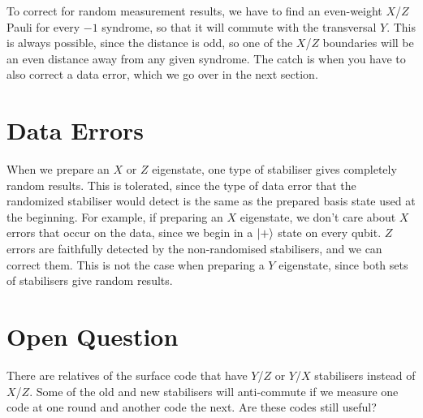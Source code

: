 \documentclass[a4paper, english]{scrartcl}
\begin{document}
To correct for random measurement results, we have to find an even-weight $X$/$Z$ Pauli for every $-1$ syndrome, so that it will commute with the transversal $Y$.
This is always possible, since the distance is odd, so one of the $X$/$Z$ boundaries will be an even distance away from any given syndrome.
The catch is when you have to also correct a data error, which we go over in the next  section.

\section{Data Errors}
When we prepare an $X$ or $Z$ eigenstate, one type of stabiliser gives completely random results. 
This is tolerated, since the type of data error that the randomized stabiliser would detect is the same as the prepared basis state used at the beginning. 
For example, if preparing an $X$ eigenstate, we don't care about $X$ errors that occur on the data, since we begin in a ${\left\vert{+}\right\rangle}$ state on every qubit.
$Z$ errors are faithfully detected by the non-randomised stabilisers, and we can correct them. 
This is not the case when preparing a $Y$ eigenstate, since both sets of stabilisers give random results. 
\section{Open Question}
There are relatives of the surface code that have $Y$/$Z$ or $Y$/$X$ stabilisers instead of $X$/$Z$.
Some of the old and new stabilisers will anti-commute if we measure one code at one round and another code the next. 
Are these codes still useful?
\end{document}
